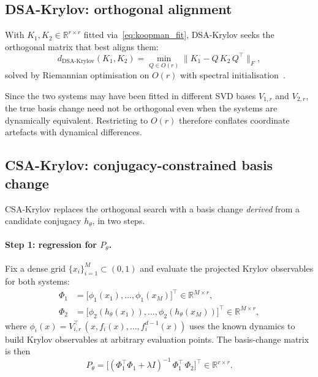 \documentclass{article}
\theoremstyle{definition}
\begin{document}
\subsection{DSA-Krylov: orthogonal alignment}

With $K_1, K_2 \in \mathbb{R}^{r\times r}$ fitted via~\eqref{eq:koopman_fit},
DSA-Krylov seeks the orthogonal matrix that best aligns them:
\begin{equation}\label{eq:dsa}
  d_{\mathrm{DSA\text{-}Krylov}}(K_1, K_2)
    = \min_{Q \in O(r)} \lVert K_1 - Q\,K_2\,Q^\top \rVert_F,
\end{equation}
solved by Riemannian optimisation on $O(r)$ with spectral
initialisation~\citep{ostrow2023beyond}.

Since the two systems may have been fitted in different SVD bases $V_{1,r}$
and $V_{2,r}$, the true basis change need not be orthogonal even when the
systems are dynamically equivalent. Restricting to $O(r)$ therefore conflates
coordinate artefacts with dynamical differences.

\subsection{CSA-Krylov: conjugacy-constrained basis change}

CSA-Krylov replaces the orthogonal search with a basis change \emph{derived}
from a candidate conjugacy $h_\theta$, in two steps.

\paragraph{Step 1: regression for $P_\theta$.}
Fix a dense grid $\{x_i\}_{i=1}^M \subset (0,1)$ and evaluate the projected
Krylov observables for both systems:
\begin{align}
  \Phi_1 &= \bigl[\phi_1(x_1), \dots, \phi_1(x_M)\bigr]^\top
           \in \mathbb{R}^{M \times r},
  \label{eq:phi1} \\
  \Phi_2 &= \bigl[\phi_2(h_\theta(x_1)), \dots,
             \phi_2(h_\theta(x_M))\bigr]^\top
           \in \mathbb{R}^{M \times r},
  \label{eq:phi2}
\end{align}
where $\phi_i(x) = V_{i,r}^\top\,(x, f_i(x), \dots, f_i^{d-1}(x))$ uses
the known dynamics to build Krylov observables at arbitrary evaluation points.
The basis-change matrix is then
\begin{equation}\label{eq:P_regression}
  P_\theta = \bigl[(\Phi_1^\top \Phi_1 + \lambda I)^{-1}\,
             \Phi_1^\top\,\Phi_2\bigr]^\top
           \in \mathbb{R}^{r \times r}.
\end{equation}
\end{document}
